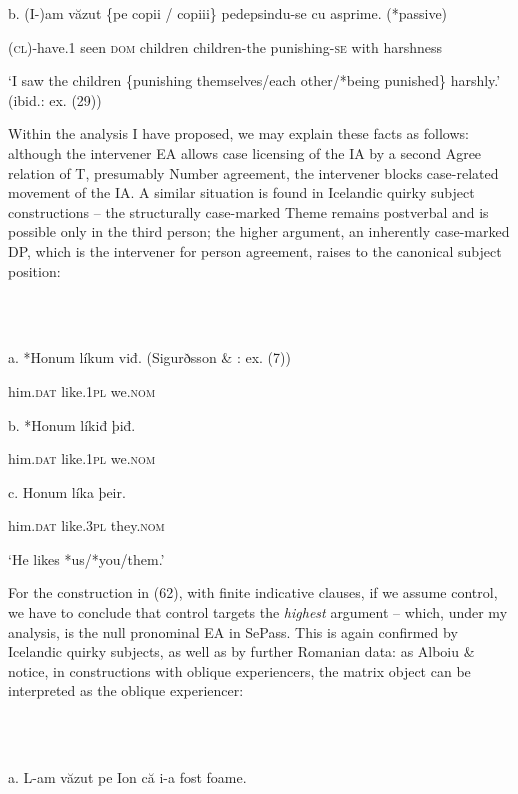\documentclass[output=paper]{langsci/langscibook}
\begin{document}
b.   (I-)am       văzut \{pe     copii   / copiii\}         pedepsindu-se cu     asprime.   (*passive)

    (\textsc{cl})-have.1 seen \textsc{dom} children children-the punishing-\textsc{se}   with harshness

‘I saw the children \{punishing themselves/each other/*being punished\} harshly.’ (ibid.: ex. (29))

Within the analysis I have proposed, we may explain these facts as follows: although the intervener EA allows case licensing of the IA by a second Agree relation of T, presumably Number agreement, the intervener blocks case-related movement of the IA. A similar situation is found in Icelandic quirky subject constructions – the structurally case-marked Theme remains postverbal and is possible only in the third\textsuperscript{} person; the higher argument, an inherently case-marked DP, which is the intervener for person agreement, raises to the canonical subject position:

\ea%
    \label{ex:key:65}
    \gll\\
        \\
    \glt
    \z

          a.   *Honum   líkum    viđ. (Sigurðsson \& \citealt{Holmberg2008}: ex. (7))

         him.\textsc{dat} like.1\textsc{pl} we.\textsc{nom}

  b.   *Honum   líkiđ       þiđ.

           him.\textsc{dat}  like.1\textsc{pl} we.\textsc{nom}

 c.      Honum   líka        þeir.

          him.\textsc{dat} like.3\textsc{pl} they.\textsc{nom}

           ‘He likes *us/*you/them.’

For the construction in (62), with finite indicative clauses, if we assume control, we have to conclude that control targets the \textit{highest} argument – which, under my analysis, is the null pronominal EA in SePass. This is again confirmed by Icelandic quirky subjects, as well as by further Romanian data: as Alboiu \& \citet{Hill2016} notice, in constructions with oblique experiencers, the matrix object can be interpreted as the oblique experiencer: 

\ea%
    \label{ex:key:66}
    \gll\\
        \\
    \glt
    \z

          a.   L-am                văzut  pe Ion    că    i-a                 fost foame.   
\end{document}
